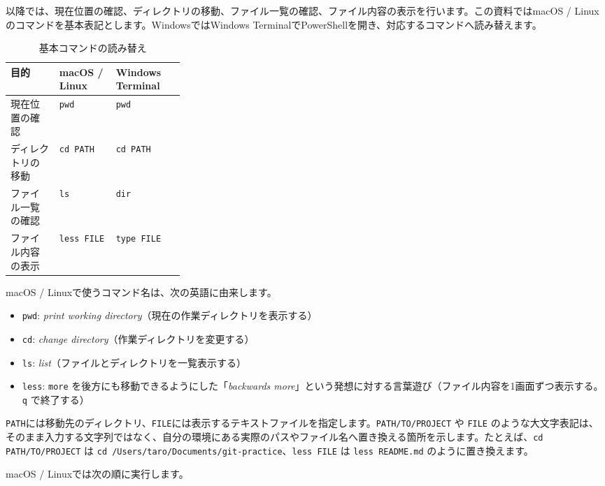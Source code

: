 \documentclass[a4paper,11pt]{jlreq}
\newcommand{\cmd}[1]{\texttt{#1}}
\begin{document}
以降では、現在位置の確認、ディレクトリの移動、ファイル一覧の確認、ファイル内容の表示を行います。この資料ではmacOS / Linuxのコマンドを基本表記とします。WindowsではWindows TerminalでPowerShellを開き、対応するコマンドへ読み替えます\cite{windows-terminal-overview,powershell-about-aliases}。

\begin{table}[htbp]
  \centering
  \caption{基本コマンドの読み替え}
  \begin{tabularx}{\linewidth}{@{}p{0.29\linewidth}XX@{}}
    \toprule
    目的 & macOS / Linux & Windows Terminal \\
    \midrule
    現在位置の確認 & \cmd{pwd} & \cmd{pwd} \\
    ディレクトリの移動 & \cmd{cd PATH} & \cmd{cd PATH} \\
    ファイル一覧の確認 & \cmd{ls} & \cmd{dir} \\
    ファイル内容の表示 & \cmd{less FILE} & \cmd{type FILE} \\
    \bottomrule
  \end{tabularx}
\end{table}

macOS / Linuxで使うコマンド名は、次の英語に由来します。

\begin{itemize}[nosep]
  \item \cmd{pwd}: \textit{print working directory}（現在の作業ディレクトリを表示する）\cite{gnu-coreutils-manual}
  \item \cmd{cd}: \textit{change directory}（作業ディレクトリを変更する）\cite{bash-builtins}
  \item \cmd{ls}: \textit{list}（ファイルとディレクトリを一覧表示する）\cite{gnu-coreutils-manual}
  \item \cmd{less}: \cmd{more} を後方にも移動できるようにした「\textit{backwards more}」という発想に対する言葉遊び（ファイル内容を1画面ずつ表示する。\cmd{q} で終了する）\cite{less-homepage}
\end{itemize}

\cmd{PATH}には移動先のディレクトリ、\cmd{FILE}には表示するテキストファイルを指定します。\cmd{PATH/TO/PROJECT} や \cmd{FILE} のような大文字表記は、そのまま入力する文字列ではなく、自分の環境にある実際のパスやファイル名へ置き換える箇所を示します。たとえば、\cmd{cd PATH/TO/PROJECT} は \cmd{cd /Users/taro/Documents/git-practice}、\cmd{less FILE} は \cmd{less README.md} のように置き換えます。

macOS / Linuxでは次の順に実行します。
\end{document}
